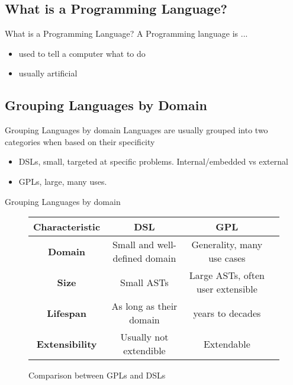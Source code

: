 \subsection{What is a Programming Language?}
\begin{frame}{What is a Programming Language?}
    A Programming language is ...
    \begin{itemize}[<+->]
        \item used to tell a computer what to do
        \item usually artificial
    \end{itemize}
\end{frame}



\subsection{Grouping Languages by Domain}
\begin{frame}{Grouping Languages by domain}
    Languages are usually grouped into two categories when based on their specificity
    \begin{itemize}[<+->]
        \item DSLs, small,  targeted at specific problems. Internal/embedded vs external 
        \item GPLs, large, many uses.
    \end{itemize}
\end{frame}

\begin{frame}{Grouping Languages by domain}
    \begin{figure}[!h]
        \centering
        \begin{tabular}{|c|c|c|c|}
            \hline
            \textbf{Characteristic} &\textbf{DSL } &\textbf{GPL}\\
            \hline
            \textbf{Domain} & Small and well-defined domain & Generality, many use cases\\
            \hline
            \textbf{Size} &Small ASTs & Large ASTs, often user extensible\\
            \hline
            \textbf{Lifespan} &As long as their domain &years to decades\\
            \hline
            \textbf{Extensibility} &Usually not extendible & Extendable\\
            \hline
        \end{tabular}%
        \caption{Comparison between GPLs and DSLs}
    \end{figure}%
\end{frame}



